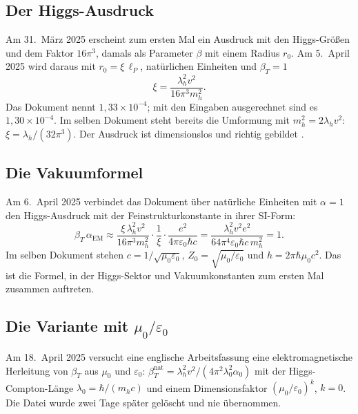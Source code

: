 \subsection{Der Higgs-Ausdruck}

Am 31.~März 2025 erscheint zum ersten Mal ein Ausdruck mit den Higgs-Größen und dem Faktor
$16\pi^3$, damals als Parameter $\beta$ mit einem Radius $r_0$. Am 5.~April 2025 wird daraus mit
$r_0=\xi\,\ell_P$, natürlichen Einheiten und $\beta_T=1$
\begin{equation}
  \xi=\frac{\lambda_h^2v^2}{16\pi^3m_h^2}.
\end{equation}
Das Dokument nennt $1{,}33\times10^{-4}$; mit den Eingaben ausgerechnet sind es
$1{,}30\times10^{-4}$. Im selben Dokument steht bereits die Umformung mit $m_h^2=2\lambda_hv^2$:
$\xi=\lambda_h/(32\pi^3)$. Der Ausdruck ist dimensionslos und richtig gebildet \BM.

\subsection{Die Vakuumformel}

Am 6.~April 2025 verbindet das Dokument über natürliche Einheiten mit $\alpha=1$ den
Higgs-Ausdruck mit der Feinstrukturkonstante in ihrer SI-Form:
\begin{equation}
  \beta_T\,\alpha_{\text{EM}}\approx\frac{\xi\,\lambda_h^2v^2}{16\pi^3m_h^2}\cdot\frac1\xi\cdot
  \frac{e^2}{4\pi\varepsilon_0\hbar c}
  =\frac{\lambda_h^2v^2e^2}{64\pi^4\varepsilon_0\hbar c\,m_h^2}=1 .
  \label{eq:vakuum}
\end{equation}
Im selben Dokument stehen $c=1/\sqrt{\mu_0\varepsilon_0}$, $Z_0=\sqrt{\mu_0/\varepsilon_0}$ und
$h=2\pi\hbar\mu_0c^2$. Das ist die Formel, in der Higgs-Sektor und Vakuumkonstanten zum ersten Mal
zusammen auftreten.

\subsection{Die Variante mit \texorpdfstring{$\mu_0/\varepsilon_0$}{mu0/eps0}}

Am 18.~April 2025 versucht eine englische Arbeitsfassung eine \glqq elektromagnetische
Herleitung\grqq{} von $\beta_T$ aus $\mu_0$ und $\varepsilon_0$:
$\beta_T^{\text{nat}}=\lambda_h^2v^2/(4\pi^2\lambda_0^2\alpha_0)$ mit der Higgs-Compton-Länge
$\lambda_0=\hbar/(m_hc)$ und einem Dimensionsfaktor $(\mu_0/\varepsilon_0)^k$, $k=0$. Die Datei wurde
zwei Tage später gelöscht und nie übernommen.

